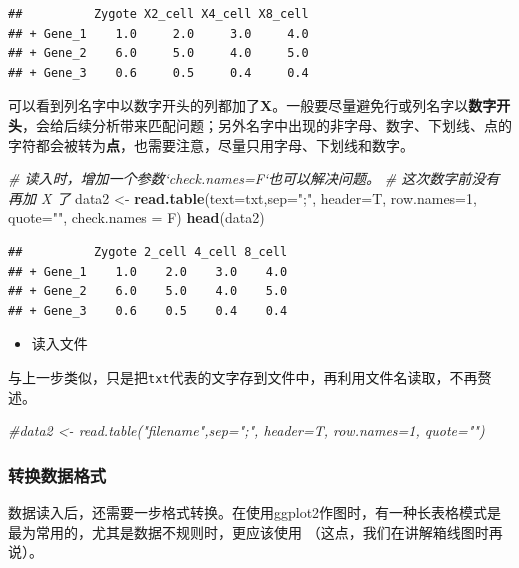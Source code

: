 \documentclass[]{article}
\newenvironment{Shaded}{\begin{snugshade}}{\end{snugshade}}
\newcommand{\KeywordTok}[1]{\textcolor[rgb]{0.13,0.29,0.53}{\textbf{{#1}}}}
\newcommand{\DataTypeTok}[1]{\textcolor[rgb]{0.13,0.29,0.53}{{#1}}}
\newcommand{\DecValTok}[1]{\textcolor[rgb]{0.00,0.00,0.81}{{#1}}}
\newcommand{\StringTok}[1]{\textcolor[rgb]{0.31,0.60,0.02}{{#1}}}
\newcommand{\CommentTok}[1]{\textcolor[rgb]{0.56,0.35,0.01}{\textit{{#1}}}}
\newcommand{\NormalTok}[1]{{#1}}
\providecommand{\tightlist}{%
  \setlength{\itemsep}{0pt}\setlength{\parskip}{0pt}}
\numberwithin{figure}{section}
\numberwithin{table}{section}
\theoremstyle{definition}
\theoremstyle{definition}
\theoremstyle{definition}
\theoremstyle{remark}
\begin{document}
\begin{verbatim}
##          Zygote X2_cell X4_cell X8_cell
## + Gene_1    1.0     2.0     3.0     4.0
## + Gene_2    6.0     5.0     4.0     5.0
## + Gene_3    0.6     0.5     0.4     0.4
\end{verbatim}

可以看到列名字中以数字开头的列都加了\textbf{X}。一般要尽量避免行或列名字以\textbf{数字开头}，会给后续分析带来匹配问题；另外名字中出现的非字母、数字、下划线、点的字符都会被转为\textbf{点}，也需要注意，尽量只用字母、下划线和数字。

\begin{Shaded}
\begin{Highlighting}[]
\CommentTok{# 读入时，增加一个参数`check.names=F`也可以解决问题。}
\CommentTok{# 这次数字前没有再加 X 了}
\NormalTok{data2 <-}\StringTok{ }\KeywordTok{read.table}\NormalTok{(}\DataTypeTok{text=}\NormalTok{txt,}\DataTypeTok{sep=}\StringTok{";"}\NormalTok{, }\DataTypeTok{header=}\NormalTok{T, }\DataTypeTok{row.names=}\DecValTok{1}\NormalTok{, }\DataTypeTok{quote=}\StringTok{""}\NormalTok{, }\DataTypeTok{check.names =} \NormalTok{F)}
\KeywordTok{head}\NormalTok{(data2)}
\end{Highlighting}
\end{Shaded}

\begin{verbatim}
##          Zygote 2_cell 4_cell 8_cell
## + Gene_1    1.0    2.0    3.0    4.0
## + Gene_2    6.0    5.0    4.0    5.0
## + Gene_3    0.6    0.5    0.4    0.4
\end{verbatim}

\begin{itemize}
\tightlist
\item
  读入文件
\end{itemize}

与上一步类似，只是把\texttt{txt}代表的文字存到文件中，再利用文件名读取，不再赘述。

\begin{Shaded}
\begin{Highlighting}[]
\CommentTok{#data2 <- read.table("filename",sep=";", header=T, row.names=1, quote="")}
\end{Highlighting}
\end{Shaded}

\subsubsection{转换数据格式}

数据读入后，还需要一步格式转换。在使用ggplot2作图时，有一种长表格模式是最为常用的，尤其是数据不规则时，更应该使用
（这点，我们在讲解箱线图时再说）。
\end{document}
